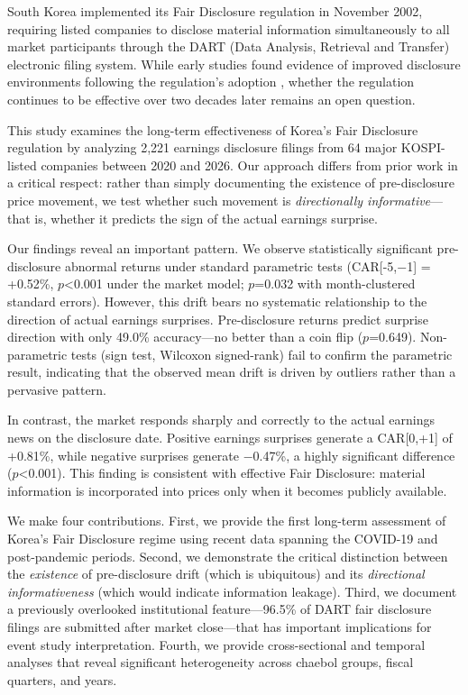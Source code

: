 \documentclass[review,authoryear]{elsarticle}
\begin{document}
South Korea implemented its Fair Disclosure regulation in November 2002, requiring listed companies to disclose material information simultaneously to all market participants through the DART (Data Analysis, Retrieval and Transfer) electronic filing system. While early studies found evidence of improved disclosure environments following the regulation's adoption \citep{yun2012fair, oh2017disclosure}, whether the regulation continues to be effective over two decades later remains an open question.

This study examines the long-term effectiveness of Korea's Fair Disclosure regulation by analyzing 2,221 earnings disclosure filings from 64 major KOSPI-listed companies between 2020 and 2026. Our approach differs from prior work in a critical respect: rather than simply documenting the existence of pre-disclosure price movement, we test whether such movement is \textit{directionally informative}---that is, whether it predicts the sign of the actual earnings surprise.

Our findings reveal an important pattern. We observe statistically significant pre-disclosure abnormal returns under standard parametric tests (CAR[-5,$-$1] = +0.52\%, $p$<0.001 under the market model; $p$=0.032 with month-clustered standard errors). However, this drift bears no systematic relationship to the direction of actual earnings surprises. Pre-disclosure returns predict surprise direction with only 49.0\% accuracy---no better than a coin flip ($p$=0.649). Non-parametric tests (sign test, Wilcoxon signed-rank) fail to confirm the parametric result, indicating that the observed mean drift is driven by outliers rather than a pervasive pattern.

In contrast, the market responds sharply and correctly to the actual earnings news on the disclosure date. Positive earnings surprises generate a CAR[0,+1] of +0.81\%, while negative surprises generate $-$0.47\%, a highly significant difference ($p$<0.001). This finding is consistent with effective Fair Disclosure: material information is incorporated into prices only when it becomes publicly available.

We make four contributions. First, we provide the first long-term assessment of Korea's Fair Disclosure regime using recent data spanning the COVID-19 and post-pandemic periods. Second, we demonstrate the critical distinction between the \textit{existence} of pre-disclosure drift (which is ubiquitous) and its \textit{directional informativeness} (which would indicate information leakage). Third, we document a previously overlooked institutional feature---96.5\% of DART fair disclosure filings are submitted after market close---that has important implications for event study interpretation. Fourth, we provide cross-sectional and temporal analyses that reveal significant heterogeneity across chaebol groups, fiscal quarters, and years.
\end{document}
